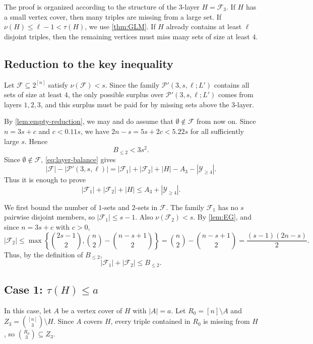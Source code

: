 \documentclass[10pt,a4paper]{article}
\numberwithin{equation}{section}
\theoremstyle{definition}
\newcommand{\F}{\mathcal F}
\newcommand{\Y}{\mathcal Y}
\begin{document}
The proof is organized according to the structure of the $3$-layer $H=\F_3$.
If $H$ has a small vertex cover, then many triples are
missing from a large set.
If $\nu(H)\le \ell-1<\tau(H)$, we use \cref{thm:GLM}.
If $H$ already contains at least $\ell$ disjoint triples, then the remaining vertices must miss many
sets of size at least $4$.


\subsection{Reduction to the key inequality}

Let $\F\subseteq2^{[n]}$ satisfy $\nu(\F)<s$.
Since the family $\mathcal P'(3,s,\ell;L')$ contains all sets of size at least $4$, the only possible surplus over $\mathcal P'(3,s,\ell;L')$ comes from layers $1,2,3$, and this surplus must be paid for by missing sets above the $3$-layer.

By \cref{lem:empty-reduction}, we may and do assume that $\emptyset\notin\F$ from now on.
Since $n=3s+c$ and $c<0.11s$, we have $2n-s=5s+2c<5.22s$ for all sufficiently large $s$.
Hence
\begin{equation}\label{eq:Ble2-less-3s2}
        B_{\le2}<3s^2.
\end{equation}
Since $\emptyset\notin\F$, \eqref{eq:layer-balance} gives
\[
        |\F|-|\mathcal P'(3,s,\ell)|
        =
        |\F_1|+|\F_2|+|H|-A_3-|\Y_{\ge4}|.
\]
Thus it is enough to prove
\begin{equation}\label{eq:key-high-terminal}
        |\F_1|+|\F_2|+|H|\le A_3+|\Y_{\ge4}|.
\end{equation}

We first bound the number of $1$-sets and $2$-sets in $\F$.
The family $\F_1$ has no $s$ pairwise disjoint members, so $|\F_1|\le s-1$.
Also $\nu(\F_2)<s$.
By \cref{lem:EG}, and since $n=3s+c$ with $c>0$,
\[
        |\F_2|\le \max\left\{\binom{2s-1}{2},\binom n2-\binom{n-s+1}{2}\right\}
        =\binom n2-\binom{n-s+1}{2}=\frac{(s-1)(2n-s)}{2}.
\]
Thus, by the definition of $B_{\le2}$,
\begin{equation}\label{eq:F12-bound-terminal}
        |\F_1|+|\F_2|\le B_{\le2}.
\end{equation}


\subsection{Case 1: $\tau(H)\le a$}

In this case, let $A$ be a vertex cover of $H$ with $|A|=a$.
Let $R_0=[n]\setminus A$ and $Z_3=\binom{[n]}3\setminus H$.
Since $A$ covers $H$, every triple contained in $R_0$ is missing from $H$, so $\binom{R_0}{3}\subseteq Z_3$.
\end{document}
